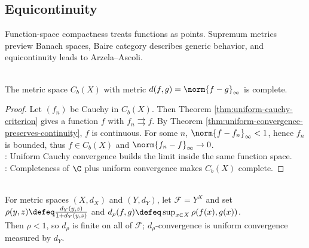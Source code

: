\subsection{Equicontinuity}

%


Function-space compactness treats functions as points. Supremum metrics preview Banach spaces, Baire category describes generic behavior, and equicontinuity leads to Arzela--Ascoli.

\begin{theorem} \label{thm:complete-supremum-metric-space} \\
The metric space $C_b(X)$ with metric $d(f,g)=\norm{f-g}_{\infty}$ is complete.
\begin{proof}
Let $(f_n)$ be Cauchy in $C_b(X)$. Then Theorem \ref{thm:uniform-cauchy-criterion} gives a function $f$ with $f_n\rightrightarrows f$. By Theorem \ref{thm:uniform-convergence-preserves-continuity}, $f$ is continuous. For some $n$, $\norm{f-f_n}_{\infty}<1$, hence $f_n$ is bounded, thus $f\in C_b(X)$ and $\norm{f_n-f}_{\infty}\to0$.\\
: Uniform Cauchy convergence builds the limit inside the same function space.\\
: Completeness of $\C$ plus uniform convergence makes $C_b(X)$ complete.
\end{proof}
\end{theorem}

\begin{definition} \label{def:bounded-target-metric-function-space} \\
For metric spaces $(X,d_X)$ and $(Y,d_Y)$, let $\mathcal{F}=Y^X$ and set $\rho(y,z)\defeq\frac{d_Y(y,z)}{1+d_Y(y,z)}$ and $d_\rho(f,g)\defeq\sup_{x\in X}\rho(f(x),g(x))$.\\
Then $\rho<1$, so $d_\rho$ is finite on all of $\mathcal{F}$; $d_\rho$-convergence is uniform convergence measured by $d_Y$.
\end{definition}

